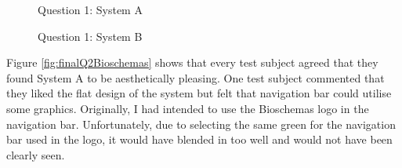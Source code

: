 \begin{figure}[!h]
  \centering
  \begin{minipage}[b]{0.47\textwidth}
    \caption{Question 1: System A}
    \label{fig:finalQ1Bioschemas}
  \end{minipage}
  \hfill
  \begin{minipage}[b]{0.47\textwidth}
    \caption{Question 1: System B}
    \label{fig:finalQ1Kaizen}
  \end{minipage}
\end{figure}


\newpage
Figure \ref{fig:finalQ2Bioschemas} shows that every test subject agreed that they found System A to be aesthetically pleasing. One test subject commented that they liked the flat design of the system but felt that navigation bar could utilise some graphics. Originally, I had intended to use the Bioschemas logo in the navigation bar. Unfortunately, due to selecting the same green for the navigation bar used in the logo, it would have blended in too well and would not have been clearly seen.

